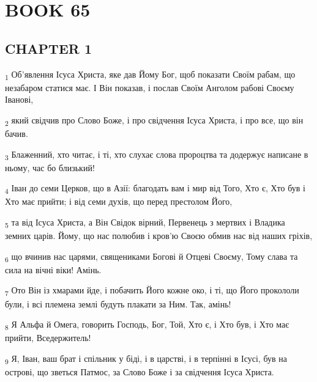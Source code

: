 \section{BOOK 65}
\subsection{CHAPTER 1}
\begin{tcolorbox}
\textsubscript{1} Об'явлення Ісуса Христа, яке дав Йому Бог, щоб показати Своїм рабам, що незабаром статися має. І Він показав, і послав Своїм Анголом рабові Своєму Іванові,
\end{tcolorbox}
\begin{tcolorbox}
\textsubscript{2} який свідчив про Слово Боже, і про свідчення Ісуса Христа, і про все, що він бачив.
\end{tcolorbox}
\begin{tcolorbox}
\textsubscript{3} Блаженний, хто читає, і ті, хто слухає слова пророцтва та додержує написане в ньому, час бо близький!
\end{tcolorbox}
\begin{tcolorbox}
\textsubscript{4} Іван до семи Церков, що в Азії: благодать вам і мир від Того, Хто є, Хто був і Хто має прийти; і від семи духів, що перед престолом Його,
\end{tcolorbox}
\begin{tcolorbox}
\textsubscript{5} та від Ісуса Христа, а Він Свідок вірний, Первенець з мертвих і Владика земних царів. Йому, що нас полюбив і кров'ю Своєю обмив нас від наших гріхів,
\end{tcolorbox}
\begin{tcolorbox}
\textsubscript{6} що вчинив нас царями, священиками Богові й Отцеві Своєму, Тому слава та сила на вічні віки! Амінь.
\end{tcolorbox}
\begin{tcolorbox}
\textsubscript{7} Ото Він із хмарами йде, і побачить Його кожне око, і ті, що Його прокололи були, і всі племена землі будуть плакати за Ним. Так, амінь!
\end{tcolorbox}
\begin{tcolorbox}
\textsubscript{8} Я Альфа й Омега, говорить Господь, Бог, Той, Хто є, і Хто був, і Хто має прийти, Вседержитель!
\end{tcolorbox}
\begin{tcolorbox}
\textsubscript{9} Я, Іван, ваш брат і спільник у біді, і в царстві, і в терпінні в Ісусі, був на острові, що зветься Патмос, за Слово Боже і за свідчення Ісуса Христа.
\end{tcolorbox}
